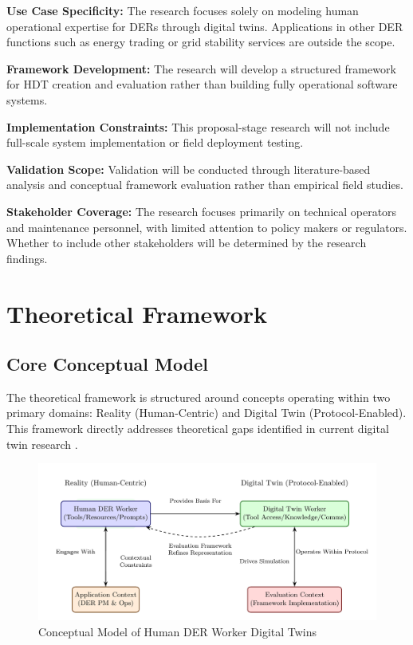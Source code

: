 \documentclass[12pt,a4paper]{article}
\begin{document}
\textbf{Use Case Specificity:} The research focuses solely on modeling human operational expertise for DERs through digital twins. Applications in other DER functions such as energy trading or grid stability services are outside the scope.

\textbf{Framework Development:} The research will develop a structured framework for HDT creation and evaluation rather than building fully operational software systems.

\textbf{Implementation Constraints:} This proposal-stage research will not include full-scale system implementation or field deployment testing.

\textbf{Validation Scope:} Validation will be conducted through literature-based analysis and conceptual framework evaluation rather than empirical field studies.

\textbf{Stakeholder Coverage:} The research focuses primarily on technical operators and maintenance personnel, with limited attention to policy makers or regulators. Whether to include other stakeholders will be determined by the research findings.

\section{Theoretical Framework}
\label{sec:framework}

\subsection{Core Conceptual Model}

The theoretical framework is structured around concepts operating within two primary domains: Reality (Human-Centric) and Digital Twin (Protocol-Enabled). This framework directly addresses theoretical gaps identified in current digital twin research \cite{10.1186/s10033-024-00998-7} \cite{10.1016/j.ifacol.2022.09.675}.

\begin{figure}[h!]
    \centering
    \includegraphics[width=\linewidth]{conceptual-model-diagram-1.png}
    \caption{Conceptual Model of Human DER Worker Digital Twins}
    \label{fig:conceptual-model}
\end{figure}
\end{document}
